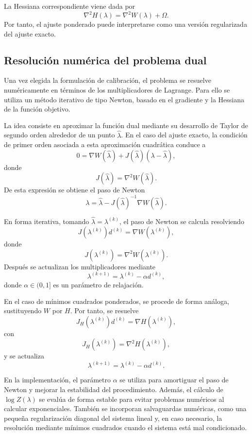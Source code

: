 La Hessiana correspondiente viene dada por
\[
\nabla^2H(\lambda)
=
\nabla^2W(\lambda)+\Omega.
\]
Por tanto, el ajuste ponderado puede interpretarse como una versión regularizada del ajuste exacto.


\subsection{Resolución numérica del problema dual}

Una vez elegida la formulación de calibración, el problema se resuelve numéricamente en términos de los multiplicadores de Lagrange. Para ello se utiliza un método iterativo de tipo Newton, basado en el gradiente y la Hessiana de la función objetivo.

La idea consiste en aproximar la función dual mediante su desarrollo de Taylor de segundo orden alrededor de un punto \(\widehat{\lambda}\). En el caso del ajuste exacto, la condición de primer orden asociada a esta aproximación cuadrática conduce a
\[
0
=
\nabla W(\widehat{\lambda})
+
J(\widehat{\lambda})(\lambda-\widehat{\lambda}),
\]
donde
\[
J(\widehat{\lambda})=\nabla^2 W(\widehat{\lambda}).
\]
De esta expresión se obtiene el paso de Newton
\[
\lambda
=
\widehat{\lambda}
-
J(\widehat{\lambda})^{-1}\nabla W(\widehat{\lambda}).
\]

En forma iterativa, tomando \(\widehat{\lambda}=\lambda^{(k)}\), el paso de Newton se calcula resolviendo
\[
J(\lambda^{(k)})d^{(k)}
=
\nabla W(\lambda^{(k)}),
\]
donde
\[
J(\lambda^{(k)})=\nabla^2 W(\lambda^{(k)}).
\]
Después se actualizan los multiplicadores mediante
\[
\lambda^{(k+1)}
=
\lambda^{(k)}
-
\alpha d^{(k)},
\]
donde \(\alpha\in(0,1]\) es un parámetro de relajación.\medskip

En el caso de mínimos cuadrados ponderados, se procede de forma análoga, sustituyendo \(W\) por \(H\). Por tanto, se resuelve
\[
J_H(\lambda^{(k)})d^{(k)}
=
\nabla H(\lambda^{(k)}),
\]
con
\[
J_H(\lambda^{(k)})
=
\nabla^2 H(\lambda^{(k)}),
\]
y se actualiza
\[
\lambda^{(k+1)}
=
\lambda^{(k)}
-
\alpha d^{(k)}.
\]

En la implementación, el parámetro \(\alpha\) se utiliza para amortiguar el paso de Newton y mejorar la estabilidad del procedimiento. Además, el cálculo de \(\log Z(\lambda)\) se evalúa de forma estable para evitar problemas numéricos al calcular exponenciales. También se incorporan salvaguardas numéricas, como una pequeña regularización diagonal del sistema lineal y, en caso necesario, la resolución mediante mínimos cuadrados cuando el sistema está mal condicionado.\medskip

